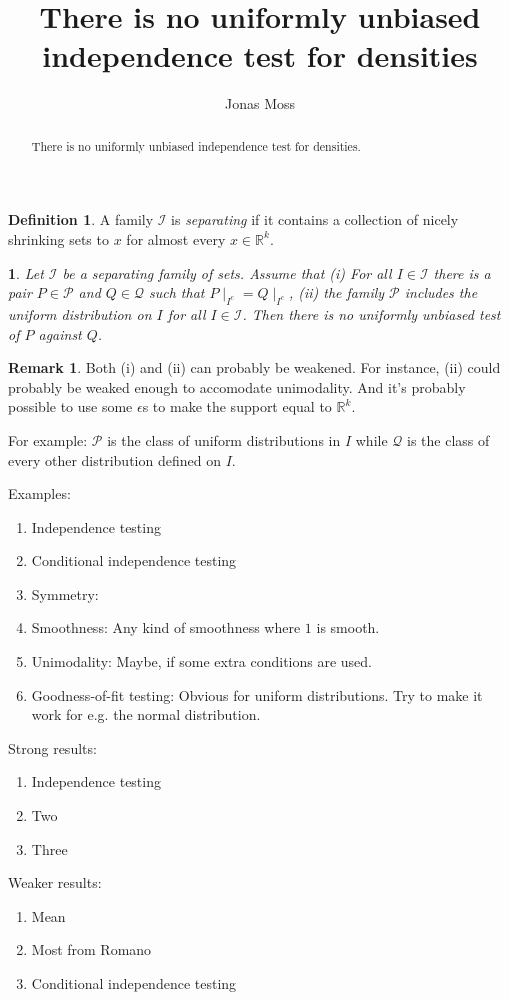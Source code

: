 \documentclass[review, authoryear]{elsarticle}
\newtheorem{thm}{\protect\theoremname}
\theoremstyle{plain}
\providecommand{\theoremname}{Theorem}
\theoremstyle{definition}
\newtheorem{definition}{Definition}
\newtheorem*{remark}{Remark}
\begin{document}
\begin{frontmatter}
\title{There is no uniformly unbiased independence test for densities}
\author{Jonas Moss}
\address{Department of Mathematics, University of Oslo, PB 1053, Blindern, NO-0316, Oslo, Norway}
\begin{abstract} 
There is no uniformly unbiased independence test for densities. 
\end{abstract}
\end{frontmatter}

\begin{definition}
A family $\mathcal{I}$ is \emph{separating} if it contains a collection of nicely shrinking sets to $x$ for almost every $x \in \mathbb{R}^k$.
\end{definition}


\begin{thm}
\label{lem:Main theorem}
Let $\mathcal{I}$ be a separating family of sets. Assume that
(i) For all $I \in \mathcal{I}$ there is a pair $P\in \mathcal{P}$ and $Q \in \mathcal{Q}$ such that $P\mid_{I^c} = Q\mid_{I^c}$, 
(ii) the family $\mathcal{P}$ includes the uniform distribution on $I$ for all $I \in \mathcal{I}$. Then there is no uniformly unbiased test of $P$ against $Q$.
\end{thm}

\begin{remark}
Both (i) and (ii) can probably be weakened. For instance, (ii) could probably be weaked enough to accomodate unimodality. And it's probably possible to use some $\epsilon$s to make the support equal to $\mathbb{R}^k$.
\end{remark}

For example: $\mathcal{P}$ is the class of uniform distributions in $I$ while $\mathcal{Q}$ is the class of every other distribution defined on $I$.

Examples:
\begin{enumerate}
	\item Independence testing
	\item Conditional independence testing
	\item Symmetry: 
	\item Smoothness: Any kind of smoothness where $1$ is smooth.
	\item Unimodality: Maybe, if some extra conditions are used. 
	\item Goodness-of-fit testing: Obvious for uniform distributions. Try to make it work for e.g. the normal distribution. 
\end{enumerate}


Strong results:
\begin{enumerate}
	\item Independence testing
	\item Two
	\item Three
\end{enumerate}

Weaker results:
\begin{enumerate}
	\item Mean
	\item Most from Romano
	\item Conditional independence testing
\end{enumerate}




\end{document}
